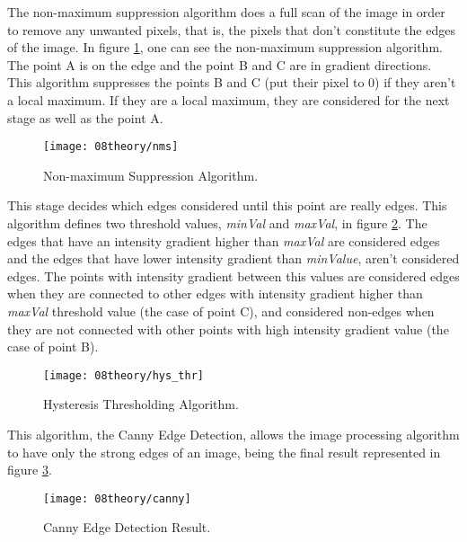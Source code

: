 
The non-maximum suppression algorithm does a full scan of the image in order to remove any unwanted pixels, that is, the pixels that don't constitute the edges of the image. In figure \ref{fig:nms}, one can see the non-maximum suppression algorithm. The point A is on the edge and the point B and C are in gradient directions. This algorithm suppresses the points B and C (put their pixel to 0) if they aren't a local maximum. If they are a local maximum, they are considered for the next stage as well as the point A.

\begin{figure}[H]
	\centering
	\texttt{[image: 08theory/nms]}
	\caption{Non-maximum Suppression Algorithm.}
	\label{fig:nms}
\end{figure}


This stage decides which edges considered until this point are really edges. This algorithm defines two threshold values, \textit{minVal} and \textit{maxVal}, in figure \ref{fig:hys_thr}. The edges that have an intensity gradient higher than \textit{maxVal} are considered edges and the edges that have lower intensity gradient than \textit{minValue}, aren't considered edges. The points with intensity gradient between this values are considered edges when they are connected to other edges with intensity gradient higher than \textit{maxVal} threshold value (the case of point C), and considered non-edges when they are not connected with other points with high intensity gradient value (the case of point B). 

\begin{figure}[H]
	\centering
	\texttt{[image: 08theory/hys\_thr]}
	\caption{Hysteresis Thresholding Algorithm.}
	\label{fig:hys_thr}
\end{figure}

This algorithm, the Canny Edge Detection, allows the image processing algorithm to have only the strong edges of an image, being the final result represented in figure \ref{fig:canny}.

\begin{figure}[H]
	\centering
	\texttt{[image: 08theory/canny]}
	\caption{Canny Edge Detection Result.}
	\label{fig:canny}
\end{figure}

\clearpage
{}

